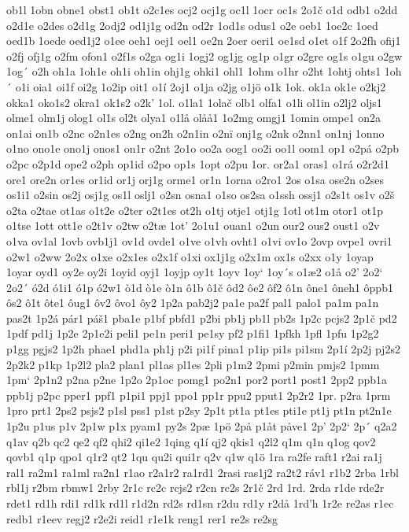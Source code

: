 ob1l
1obn
obne1
obst1
ob1t
o2c1es
ocj2
ocj1g
oc1l
1ocr
oc1s
2o1č
o1d
odb1
o2dd
o2d1e
o2des
o2d1g
2odj2
od1j1g
od2n
od2r
1od1s
odus1
o2e
oeb1
1oe2c
1oed
oed1b
1oede
oed1j2
o1ee
oeh1
oej1
oel1
oe2n
2oer
oeri1
oe1sd
o1et
o1f
2o2fh
ofij1
o2fj
ofj1g
o2fm
ofon1
o2f1s
o2ga
og1i
1ogj2
og1jg
og1p
o1gr
o2gre
og1s
o1gu
o2gw
1og´
o2h
oh1a
1oh1e
oh1i
oh1in
ohj1g
ohki1
ohl1
1ohm
o1hr
o2ht
1ohtj
ohts1
1oh´
o1i
oia1
oi1f
oi2g
1o2ip
oit1
o1í
2oj1
o1ja
o2jg
o1jö
o1k
1ok.
ok1a
ok1e
o2kj2
okka1
oko1s2
okra1
ok1s2
o2k'
1ol.
o1la1
1olač
olb1
olfa1
o1li
ol1in
o2lj2
oljs1
olme1
olm1j
olog1
ol1s
ol2t
olya1
o1lå
olåå1
1o2mg
omgj1
1omin
ompe1
on2a
on1ai
on1b
o2nc
o2n1es
o2ng
on2h
o2n1in
o2nï
onj1g
o2nk
o2nn1
on1nj
1onno
o1no
ono1e
ono1j
onos1
on1r
o2nt
2o1o
oo2a
oog1
oo2i
oo1l
oom1
op1
o2pá
o2pb
o2pc
o2p1d
ope2
o2ph
op1id
o2po
op1s
1opt
o2pu
1or.
or2a1
oras1
o1rá
o2r2d1
ore1
ore2n
or1es
or1id
or1j
orj1g
orme1
or1n
1orna
o2ro1
2os
o1sa
ose2n
o2ses
os1i1
o2sin
os2j
osj1g
os1l
oslj1
o2sn
osna1
o1so
os2sa
o1ssh
ossj1
o2s1t
os1v
o2š
o2ta
o2tae
ot1as
o1t2e
o2ter
o2t1es
ot2h
o1tj
otje1
otj1g
1otl
ot1m
otor1
ot1p
o1tse
1ott
ott1e
o2t1v
o2tw
o2tæ
1ot'
2o1u1
ouan1
o2un
our2
ous2
oust1
o2v
o1va
ov1al
1ovb
ovb1j1
ov1d
ovde1
o1ve
o1vh
ovht1
o1vi
ov1o
2ovp
ovpe1
ovri1
o2w1
o2ww
2o2x
o1xe
o2x1es
o2x1f
o1xi
ox1j1g
o2x1m
ox1s
o2xx
o1y
1oyap
1oyar
oyd1
oy2e
oy2i
1oyid
oyj1
1oyjp
oy1t
1oyv
1oy`
1oy´s
o1æ2
o1å
o2'
2o2`
2o2´
ó2d
ó1i1
ó1p
ó2w1
ò1d
ò1e
ò1n
ô1b
ô1č
ôd2
ôe2
ôf2
ô1n
ône1
ôneh1
ôppb1
ôs2
ô1t
ôte1
ôug1
ôv2
ôvo1
ôy2
1p2a
pab2j2
pa1e
pa2f
pal1
palo1
pa1m
pa1n
pas2t
1p2á
pár1
páš1
pba1e
p1bf
pbfd1
p2bi
pb1j
pb1l
pb2s
1p2c
pcjs2
2p1č
pd2
1pdf
pd1j
1p2e
2p1e2i
peli1
pe1n
peri1
pe1sy
pf2
p1fi1
1pfkh
1pfl
1pfu
1p2g2
p1gg
pgjs2
1p2h
phae1
phd1a
ph1j
p2i
pi1f
pina1
p1ip
pi1s
pi1sm
2p1í
2p2j
pj2s2
2p2k2
p1kp
1p2l2
pla2
plan1
pl1as
pl1es
2pli
p1m2
2pmi
p2min
pmjs2
1pmm
1pm`
2p1n2
p2na
p2ne
1p2o
2p1oc
pomg1
po2n1
por2
port1
post1
2pp2
ppb1a
ppb1j
p2pc
pper1
ppf1
p1pi1
ppj1
ppo1
pp1r
ppu2
pput1
2p2r2
1pr.
p2ra
1prm
1pro
prt1
2ps2
psjs2
p1sl
pss1
p1st
p2sy
2p1t
pt1a
pt1es
pti1e
pt1j
pt1n
pt2n1e
1p2u
p1us
p1v
2p1w
p1x
pyam1
py2s
2pæ
1pö
2på
p1åt
påve1
2p'
2p2`
2p´
q2a2
q1av
q2b
qc2
qe2
qf2
qhi2
qi1e2
1qing
q1í
qj2
qkis1
q2l2
q1m
q1n
q1og
qov2
qovb1
q1p
qpo1
q1r2
qt2
1qu
qu2i
qui1r
q2v
q1w
q1ö
1ra
ra2fe
raft1
r2ai
ra1j
ral1
ra2m1
ra1ml
ra2n1
r1ao
r2a1r2
ra1rd1
2rasi
ras1j2
ra2t2
ráv1
r1b2
2rba
1rbl
rbl1j
r2bm
rbmw1
2rby
2r1c
rc2c
rcjs2
r2cn
rc2s
2r1č
2rd
1rd.
2rda
r1de
rde2r
rdet1
rd1h
rdi1
rd1k
rd1l
r1d2n
rd2s
rd1sn
r2du
rd1y
r2då
1rd'h
1r2e
re2as
r1ec
redb1
r1eev
regj2
r2e2i
reid1
r1e1k
reng1
rer1
re2s
re2sg
